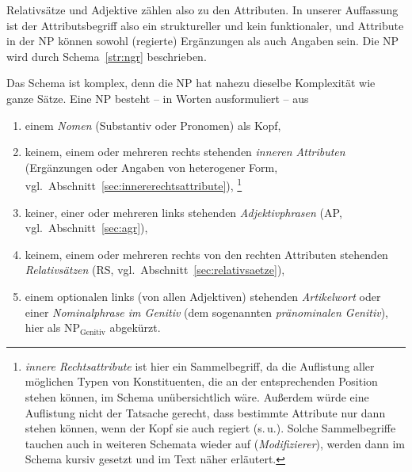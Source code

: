 
Relativsätze und Adjektive zählen also zu den Attributen.
In unserer Auffassung ist der Attributsbegriff also ein struktureller und kein funktionaler, und Attribute in der NP können sowohl (regierte) Ergänzungen als auch Angaben sein.
Die NP wird durch Schema~\ref{str:ngr} beschrieben.



Das Schema ist komplex, denn die NP hat nahezu dieselbe Komplexität wie ganze Sätze.
Eine NP besteht -- in Worten ausformuliert -- aus


\begin{enumerate}\Lf
  \item einem \textit{Nomen} (Substantiv oder Pronomen) als Kopf,
  \item keinem, einem oder mehreren rechts stehenden \textit{inneren Attributen} (Ergänzungen oder Angaben von heterogener Form, vgl.\ Abschnitt~\ref{sec:innererechtsattribute}),%
    \footnote{\textit{innere Rechtsattribute} ist hier ein Sammelbegriff, da die Auflistung aller möglichen Typen von Konstituenten, die an der entsprechenden Position stehen können, im Schema unübersichtlich wäre.
Außerdem würde eine Auflistung nicht der Tatsache gerecht, dass bestimmte Attribute nur dann stehen können, wenn der Kopf sie auch regiert (s.\,u.).
Solche Sammelbegriffe tauchen auch in weiteren Schemata wieder auf (\zB \textit{Modifizierer}), werden dann im Schema kursiv gesetzt und im Text näher erläutert.
}
  \item keiner, einer oder mehreren links stehenden \textit{Adjektivphrasen} (AP, vgl.\ Abschnitt~\ref{sec:agr}),
  \item keinem, einem oder mehreren rechts von den rechten Attributen stehenden \textit{Relativsätzen} (RS, vgl.\ Abschnitt~\ref{sec:relativsaetze}),
  \item einem optionalen links (von allen Adjektiven) stehenden \textit{Artikelwort} oder einer \textit{Nominalphrase im Genitiv} (dem sogenannten \textit{pränominalen Genitiv}), hier als NP$\mathrm{_{Genitiv}}$ abgekürzt.
\end{enumerate}


